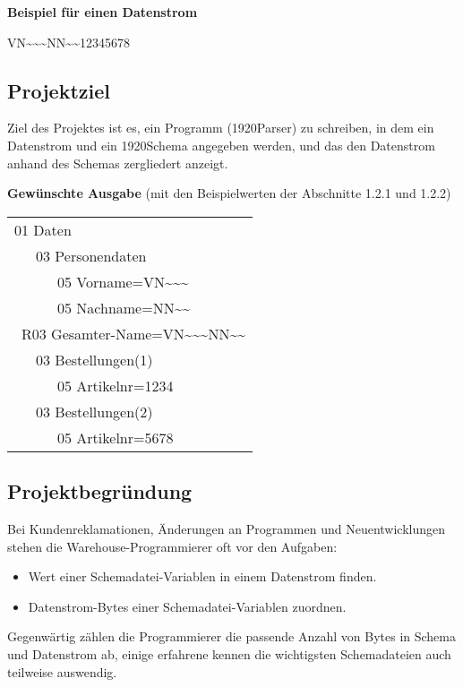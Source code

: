 \textbf{Beispiel für einen Datenstrom}

VN\textasciitilde \textasciitilde \textasciitilde NN\textasciitilde\textasciitilde12345678


\subsection{Projektziel}
\label{sec:Projektziel}
Ziel des Projektes ist es, ein Programm (1920Parser) zu schreiben, in dem ein Datenstrom und ein 1920Schema angegeben werden, und das den Datenstrom anhand des Schemas zergliedert anzeigt.

\textbf{Gewünschte Ausgabe} (mit den Beispielwerten der Abschnitte 1.2.1 und 1.2.2)

\begin{tabularx}{0px}{l}
01 Daten\\
\ \ \ 03 Personendaten\\
\ \ \ \ \ \ 05 Vorname=VN\textasciitilde \textasciitilde \textasciitilde\\
\ \ \ \ \ \ 05 Nachname=NN\textasciitilde \textasciitilde\\
\ R03 Gesamter-Name=VN\textasciitilde \textasciitilde \textasciitilde NN\textasciitilde \textasciitilde\\
\ \ \ 03 Bestellungen(1)\\
\ \ \ \ \ \ 05 Artikelnr=1234\\
\ \ \ 03 Bestellungen(2)\\
\ \ \ \ \ \ 05 Artikelnr=5678\\
\end{tabularx}

\subsection{Projektbegründung}
\label{sec:Projektbegruendung}
Bei Kundenreklamationen, Änderungen an Programmen und Neuentwicklungen stehen die Warehouse-Programmierer oft vor den Aufgaben:

\begin{itemize}
\item Wert einer Schemadatei-Variablen in einem Datenstrom finden.
\item Datenstrom-Bytes einer Schemadatei-Variablen zuordnen.
\end{itemize}

Gegenwärtig zählen die Programmierer die passende Anzahl von Bytes in Schema und Datenstrom ab, einige erfahrene kennen die wichtigsten Schemadateien auch teilweise auswendig. 


